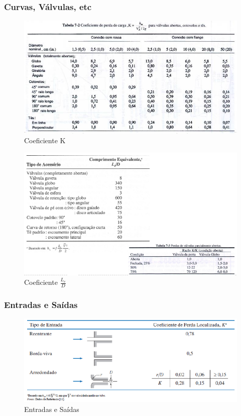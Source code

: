 \documentclass[a4paper, 12pt]{article}
\begin{document}
\subsubsection{Curvas, Válvulas, etc}
	\begin{figure}[h]
		\centering
		\includegraphics[width=0.9\linewidth]{imagens/valv}
		\caption{Coeficiente K}
		\label{fig:valv}
	\end{figure}

	\newpage
	\begin{figure}[h]
		\centering
		\includegraphics[width=0.9\linewidth]{imagens/valv2}
		\caption{Coeficiente $\frac{L_{e}}{D}$}
		\label{fig:valv2}
	\end{figure}
	
	\newpage
\subsubsection{Entradas e Saídas}
	\begin{figure}[h]
		\centering
		\includegraphics[width=0.9\linewidth]{imagens/valv3}
		\caption{Entradas e Saídas}
		\label{fig:valv3}
	\end{figure}
	
\end{document}
